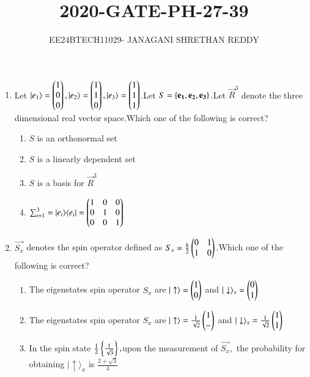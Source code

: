 \documentclass[journal]{IEEEtran}
\begin{document}
 


\vspace{3cm}

\title{2020-GATE-PH-27-39}
\author{EE24BTECH11029- JANAGANI SHRETHAN REDDY}
\maketitle{}
\bigskip
\renewcommand{\thefigure}{\theenumi}
\renewcommand{\thetable}{\theenum}
\begin{enumerate}
    \item Let $|e_1\rangle=\begin{pmatrix}1\\0\\0\end{pmatrix},|e_2\rangle=\begin{pmatrix}1\\1\\0\end{pmatrix},|e_3\rangle=\begin{pmatrix}1\\1\\1\end{pmatrix}$.Let $S=\left\{\mathbf{e_1},\mathbf{e_2},\mathbf{e_3}\right\}.$Let $\vec{R}^3$ denote the three dimensional real vector space.Which one of the following is correct?
    \begin{enumerate}
        \item $S$ is an orthonormal set
        \item $S$ is a linearly dependent set
        \item $S$ is a basis for $\vec{R}^3$
        \item $\sum_{i=1}^{3}= |e_i\rangle\langle e_i|=\begin{pmatrix}1&0&0\\0&1&0\\0&0&1\end{pmatrix}$
    \end{enumerate}
    \item $\vec{S_x}$ denotes the spin operator defined as $S_x=\frac{h}{2}\begin{pmatrix}0&1\\1&0\end{pmatrix}.$Which one of the following is correct?
    \begin{enumerate}
        \item The eigenstates spin operator $S_x$ are $|\uparrow\rangle=\begin{pmatrix}1\\0\end{pmatrix} $ and $|\downarrow\rangle_x=\begin{pmatrix}0\\1\end{pmatrix}$
        \item  The eigenstates spin operator $S_x$ are $|\uparrow\rangle=\frac{1}{\sqrt{2}}\begin{pmatrix}1\\-\end{pmatrix} $ and $|\downarrow\rangle_x=\frac{1}{\sqrt{2}}\begin{pmatrix}1\\1\end{pmatrix}$
        \item In the spin state $\frac{1}{2}\left\{\frac{1}{\sqrt{3}}\right\},$upon the measurement of $\vec{S_x},$ the probability for obtaining $|\uparrow\rangle_x$ is $\frac{2+\sqrt{3}}{4}$

\end{enumerate}
\end{enumerate}
\end{document}
